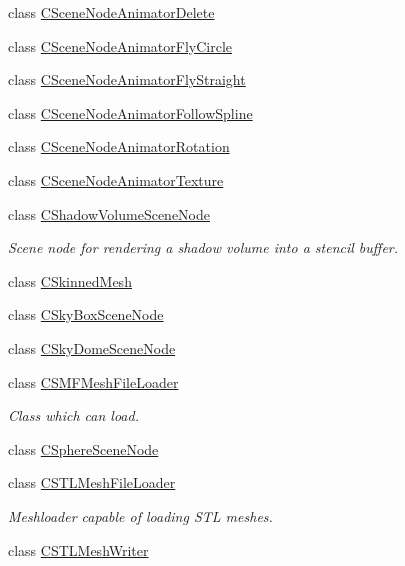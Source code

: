 \begin{DoxyCompactItemize}
class \hyperlink{classirr_1_1scene_1_1_c_scene_node_animator_delete}{C\-Scene\-Node\-Animator\-Delete}
\item 
class \hyperlink{classirr_1_1scene_1_1_c_scene_node_animator_fly_circle}{C\-Scene\-Node\-Animator\-Fly\-Circle}
\item 
class \hyperlink{classirr_1_1scene_1_1_c_scene_node_animator_fly_straight}{C\-Scene\-Node\-Animator\-Fly\-Straight}
\item 
class \hyperlink{classirr_1_1scene_1_1_c_scene_node_animator_follow_spline}{C\-Scene\-Node\-Animator\-Follow\-Spline}
\item 
class \hyperlink{classirr_1_1scene_1_1_c_scene_node_animator_rotation}{C\-Scene\-Node\-Animator\-Rotation}
\item 
class \hyperlink{classirr_1_1scene_1_1_c_scene_node_animator_texture}{C\-Scene\-Node\-Animator\-Texture}
\item 
class \hyperlink{classirr_1_1scene_1_1_c_shadow_volume_scene_node}{C\-Shadow\-Volume\-Scene\-Node}
\begin{DoxyCompactList}\small\item\em Scene node for rendering a shadow volume into a stencil buffer. \end{DoxyCompactList}\item 
class \hyperlink{classirr_1_1scene_1_1_c_skinned_mesh}{C\-Skinned\-Mesh}
\item 
class \hyperlink{classirr_1_1scene_1_1_c_sky_box_scene_node}{C\-Sky\-Box\-Scene\-Node}
\item 
class \hyperlink{classirr_1_1scene_1_1_c_sky_dome_scene_node}{C\-Sky\-Dome\-Scene\-Node}
\item 
class \hyperlink{classirr_1_1scene_1_1_c_s_m_f_mesh_file_loader}{C\-S\-M\-F\-Mesh\-File\-Loader}
\begin{DoxyCompactList}\small\item\em Class which can load. \end{DoxyCompactList}\item 
class \hyperlink{classirr_1_1scene_1_1_c_sphere_scene_node}{C\-Sphere\-Scene\-Node}
\item 
class \hyperlink{classirr_1_1scene_1_1_c_s_t_l_mesh_file_loader}{C\-S\-T\-L\-Mesh\-File\-Loader}
\begin{DoxyCompactList}\small\item\em Meshloader capable of loading S\-T\-L meshes. \end{DoxyCompactList}\item 
class \hyperlink{classirr_1_1scene_1_1_c_s_t_l_mesh_writer}{C\-S\-T\-L\-Mesh\-Writer}

\end{DoxyCompactItemize}
